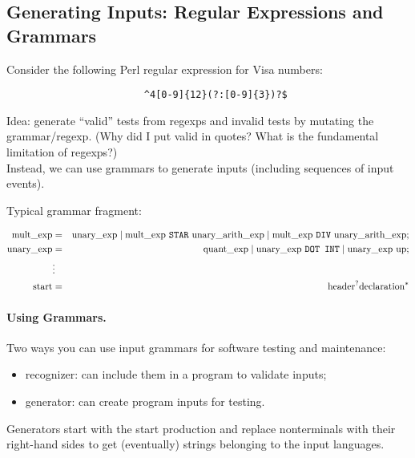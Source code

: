 \documentclass[11pt]{article}
\begin{document}
\subsection*{Generating Inputs: Regular Expressions and Grammars}

Consider the following Perl regular expression for Visa numbers:

\begin{verbatim}
                        ^4[0-9]{12}(?:[0-9]{3})?$
\end{verbatim}

Idea: generate ``valid'' tests from regexps and invalid tests by 
mutating the grammar/regexp. {\sf (Why did I put valid in quotes? What
is the fundamental limitation of regexps?)}
\\[4em]


Instead, we can use grammars to generate inputs (including sequences
of input events).

Typical grammar fragment:

\begin{eqnarray*}
\mbox{mult\_exp} &=& \mbox{unary\_exp} \mid \mbox{mult\_exp {\tt STAR} unary\_arith\_exp} \mid \mbox{mult\_exp {\tt DIV} unary\_arith\_exp}; \\
\mbox{unary\_exp} &=& \mbox{quant\_exp} \mid \mbox{unary\_exp {\tt DOT INT}}
\mid \mbox{unary\_exp up};\\
&\vdots& \\
\mbox{start} &=& \mbox{header}^? \mbox{declaration}^*
\end{eqnarray*}

\paragraph{Using Grammars.} Two ways you can use input grammars for
software testing and maintenance:
\begin{itemize}
\item recognizer: can include them in a program to validate inputs;
\item generator: can create program inputs for testing.
\end{itemize}
Generators start with the start production and replace nonterminals
with their right-hand sides to get (eventually) strings belonging to 
the input languages.
\end{document}
